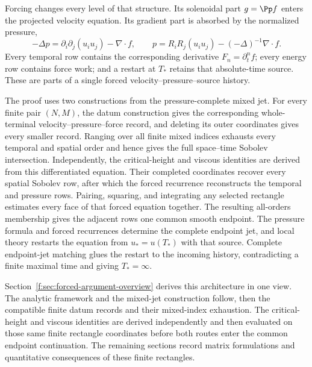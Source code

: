 Forcing changes every level of that structure. Its solenoidal part
\(g=\Pp f\) enters the projected velocity equation. Its gradient part is
absorbed by the normalized pressure,
\[
 -\Delta p=\partial_i\partial_j(u_i u_j)-\nabla\cdot f,
 \qquad
 p=R_iR_j(u_i u_j)-(-\Delta)^{-1}\nabla\cdot f.
\]
Every temporal row contains the corresponding derivative
\(F_n=\partial_t^nf\); every energy row contains force work; and a restart at
\(T_*\) retains that absolute-time source. These are parts of a single
forced velocity--pressure--source history.

The proof uses two constructions from the pressure-complete mixed jet.  For
every finite pair \((N,M)\), the datum construction gives the corresponding
whole-terminal velocity--pressure--force record, and deleting its outer
coordinates gives every smaller record.  Ranging over all finite mixed indices
exhausts every temporal and spatial order and hence gives the full
space--time Sobolev intersection.  Independently, the critical-height and
viscous identities are derived from this differentiated equation.  Their
completed coordinates recover every spatial Sobolev row, after which the forced recurrence
reconstructs the temporal and pressure rows.  Pairing, squaring, and
integrating any selected rectangle estimates every face of that forced
equation together.  The resulting all-orders membership gives the adjacent
rows one common smooth endpoint.
The pressure formula and forced recurrences determine
the complete endpoint jet, and local theory restarts the equation from
\(u_*=u(T_*)\) with that source.  Complete endpoint-jet matching glues
the restart to the incoming history, contradicting a finite maximal time and
giving \(T_*=\infty\).

Section~\ref{f:sec:forced-argument-overview} derives this architecture in one
view. The analytic framework and the mixed-jet construction follow, then the
compatible finite datum records and their mixed-index exhaustion.  The
critical-height and viscous identities are derived independently and then
evaluated on those same finite rectangle coordinates before both routes enter the
common endpoint continuation.
The remaining sections record matrix formulations and quantitative
consequences of these finite rectangles.
